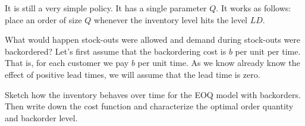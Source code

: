   \begin{solution}
It is still a very simple policy. It has a single parameter $Q$. It works as follows: place an order of size $Q$ whenever the inventory level hits the level $LD$.
  \end{solution}



\begin{question}
  What would happen stock-outs were allowed and demand during stock-outs were backordered? Let's first assume that the backordering cost is $b$ per unit per time. That is, for each customer we pay $b$ per unit time.  As we know already know the effect of positive lead times, we will assume that the lead time is zero.
  
Sketch how the inventory behaves over time for the EOQ model with backorders. Then write down the cost function and characterize the optimal order quantity and backorder level.
\end{question}

